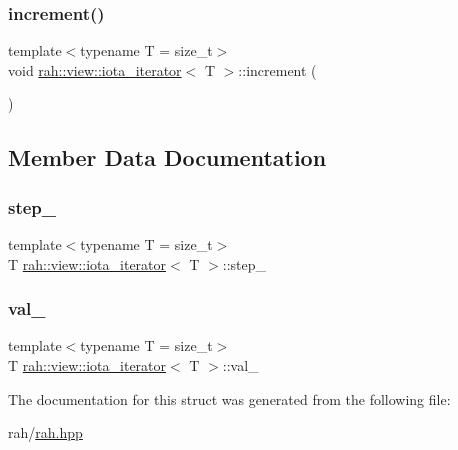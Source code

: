 \subsubsection{\texorpdfstring{increment()}{increment()}}
{\footnotesize\ttfamily template$<$typename T  = size\+\_\+t$>$ \\
void \mbox{\hyperlink{structrah_1_1view_1_1iota__iterator}{rah\+::view\+::iota\+\_\+iterator}}$<$ T $>$\+::increment (\begin{DoxyParamCaption}{ }\end{DoxyParamCaption})\hspace{0.3cm}{\ttfamily [inline]}}



\subsection{Member Data Documentation}
\mbox{\label{structrah_1_1view_1_1iota__iterator_ac30abc689d8d82810bf78ceec3893bd2}} 
\subsubsection{\texorpdfstring{step\_}{step\_}}
{\footnotesize\ttfamily template$<$typename T  = size\+\_\+t$>$ \\
T \mbox{\hyperlink{structrah_1_1view_1_1iota__iterator}{rah\+::view\+::iota\+\_\+iterator}}$<$ T $>$\+::step\+\_\+}

\mbox{\label{structrah_1_1view_1_1iota__iterator_a7a2ef77dc1a09b2eea42804c2297d057}} 
\subsubsection{\texorpdfstring{val\_}{val\_}}
{\footnotesize\ttfamily template$<$typename T  = size\+\_\+t$>$ \\
T \mbox{\hyperlink{structrah_1_1view_1_1iota__iterator}{rah\+::view\+::iota\+\_\+iterator}}$<$ T $>$\+::val\+\_\+}



The documentation for this struct was generated from the following file\+:\begin{DoxyCompactItemize}
\item 
rah/\mbox{\hyperlink{rah_8hpp}{rah.\+hpp}}\end{DoxyCompactItemize}
